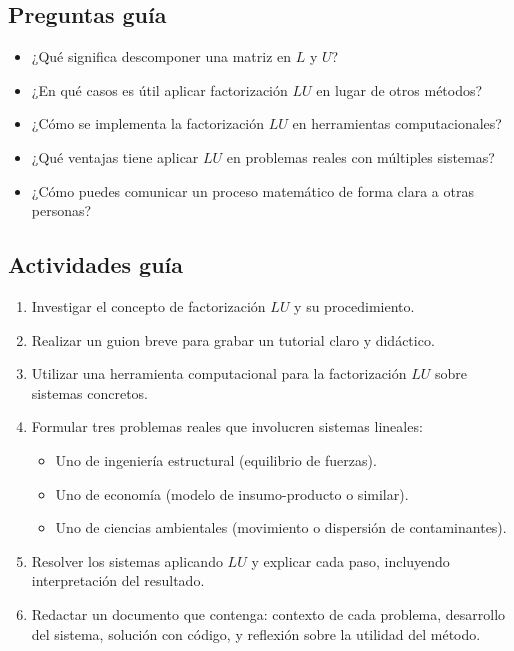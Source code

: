 \documentclass[a4,11pt]{aleph-notas}
\begin{document}
\subsection*{Preguntas guía}  
\begin{itemize}[leftmargin=*]
\item ¿Qué significa descomponer una matriz en $L$ y $U$?
\item ¿En qué casos es útil aplicar factorización $LU$ en lugar de otros métodos?
\item ¿Cómo se implementa la factorización $LU$ en herramientas computacionales?
\item ¿Qué ventajas tiene aplicar $LU$ en problemas reales con múltiples sistemas?
\item ¿Cómo puedes comunicar un proceso matemático de forma clara a otras personas?
\end{itemize}

\subsection*{Actividades guía}  
\begin{enumerate}[leftmargin=*, label={{\arabic*.}}]
\item Investigar el concepto de factorización $LU$ y su procedimiento.
\item Realizar un guion breve para grabar un tutorial claro y didáctico.
\item Utilizar una herramienta computacional para la factorización $LU$ sobre sistemas concretos.
\item Formular tres problemas reales que involucren sistemas lineales:
    \begin{itemize}[leftmargin=*]
    \item Uno de ingeniería estructural (equilibrio de fuerzas).
    \item Uno de economía (modelo de insumo-producto o similar).
    \item Uno de ciencias ambientales (movimiento o dispersión de contaminantes).
    \end{itemize}
\item Resolver los sistemas aplicando $LU$ y explicar cada paso, incluyendo interpretación del resultado.
\item Redactar un documento que contenga: contexto de cada problema, desarrollo del sistema, solución con código, y reflexión sobre la utilidad del método.
\end{enumerate}
\end{document}
